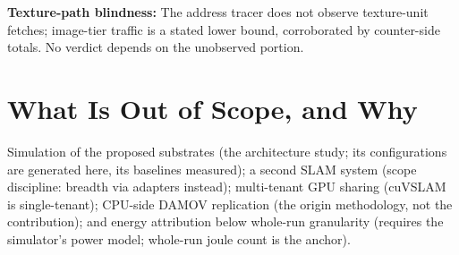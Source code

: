 \textbf{Texture-path blindness:} The address tracer does not observe texture-unit fetches; image-tier traffic is a stated lower bound, corroborated by counter-side totals. No verdict depends on the unobserved portion.

\section{What Is Out of Scope, and Why}

Simulation of the proposed substrates (the architecture study; its configurations are generated here, its baselines measured); a second SLAM system (scope discipline: breadth via adapters instead); multi-tenant GPU sharing (cuVSLAM is single-tenant); CPU-side DAMOV replication (the origin methodology, not the contribution); and energy attribution below whole-run granularity (requires the simulator's power model; whole-run joule count is the anchor).